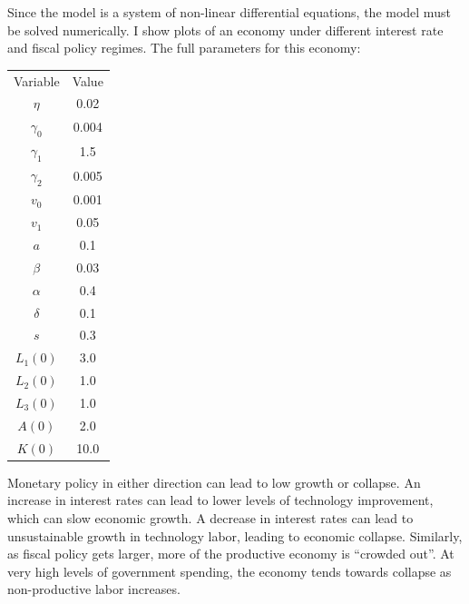 \documentclass[12pt]{article}
\theoremstyle{definition}
\begin{document}
Since the model is a system of non-linear differential equations, the model must be solved numerically.  I show plots of an economy under different interest rate and fiscal policy regimes.  The full parameters for this economy:

\begin{center}
\begin{tabular}{ c c }
      Variable  & Value  \\ 
      \(\eta\) & 0.02 \\  
      \(\gamma_0\) & 0.004   \\  
      \(\gamma_1\) & 1.5   \\  
      \(\gamma_2\) & 0.005   \\ 
      \(v_0\) & 0.001  \\  
      \(v_1\) & 0.05  \\  
      \(a\) & 0.1  \\
      \(\beta\) & 0.03   \\  
      \(\alpha\) & 0.4   \\  
      \(\delta\) & 0.1   \\  
      \(s\) & 0.3   \\ 
      \(L_1(0)\) & 3.0   \\ 
      \(L_2(0)\) & 1.0  \\ 
      \(L_3(0)\) & 1.0   \\ 
      \(A(0)\) & 2.0  \\ 
      \(K(0)\) & 10.0   
\end{tabular}
\end{center}

Monetary policy in either direction can lead to low growth or collapse.  An increase in interest rates can lead to lower levels of technology improvement, which can slow economic growth.  A decrease in interest rates can lead to unsustainable growth in technology labor, leading to economic collapse.  Similarly, as fiscal policy gets larger, more of the productive economy is ``crowded out''.  At very high levels of government spending, the economy tends towards collapse as non-productive labor increases.     
\end{document}
